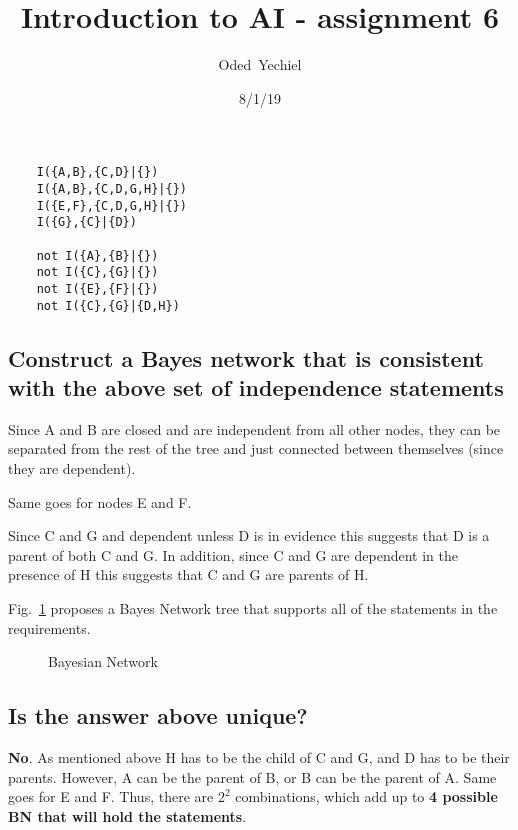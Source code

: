 \documentclass{article}                     %
\newcommand{\relation}[3][]
{
	\path [draw=blue, ->,#1] (#2) -- (#3);
}
\newcommand{\mynode}[3][]{
	\node [draw, circle] (#1) at (#2, #3) {#1};
}
\begin{document}
	
	\title{Introduction to AI - assignment 6}
	
	
	\author{Oded~Yechiel}
	
	\date{8/1/19}
	
	\maketitle
	\tableofcontents
	\section{}
	\begin{verbatim}
	I({A,B},{C,D}|{})
	I({A,B},{C,D,G,H}|{})
	I({E,F},{C,D,G,H}|{})
	I({G},{C}|{D})
	
	not I({A},{B}|{})
	not I({C},{G}|{})
	not I({E},{F}|{})
	not I({C},{G}|{D,H})
	\end{verbatim}
	\subsection{Construct a Bayes network that is consistent with the  above set of independence statements}
	Since A and B are closed and are independent from all other nodes, they can be separated from the rest of the tree and just connected between themselves (since they are dependent). 
	
	Same goes for nodes E and F.
	
	Since C and G and dependent unless D is in evidence this suggests that D is a parent of both C and G. In addition, since C and G are dependent in the presence of H this suggests that C and G are parents of H.
	
	Fig.~\ref{fig:bn1} proposes a Bayes Network tree that supports all of the statements in the requirements.
	
	\begin{figure}
		\centering
		\caption{Bayesian Network}
		\label{fig:bn1}
	\end{figure}
	
	\subsection{Is the answer above unique?}
	\textbf{No}. As mentioned above H has to be the child of C and G, and D has to be their parents. However, A can be the parent of B, or B can be the parent of A. Same goes for E and F. Thus, there are $ 2^2 $ combinations, which add up to \textbf{4 possible BN that will hold the statements}.
	
\end{document}
